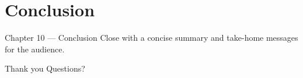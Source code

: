 \section{Conclusion}

\begin{frame}{Chapter 10 — Conclusion}
  Close with a concise summary and take-home messages for the audience.
\end{frame}

\begin{frame}{Thank you}
  \centering
  \Large Questions?
\end{frame}
